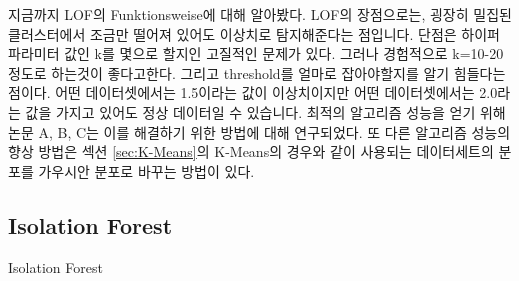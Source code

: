                 지금까지 LOF의 Funktionsweise에 대해 알아봤다. LOF의 장점으로는, 굉장히 밀집된 클러스터에서 조금만 떨어져 있어도 이상치로 탐지해준다는 점입니다. 단점은 하이퍼파라미터 값인 k를 몇으로 할지인 고질적인 문제가 있다. 그러나 경험적으로 k=10-20 \cite{Breunig00} 정도로 하는것이 좋다고한다. 그리고 threshold를 얼마로 잡아야할지를 알기 힘들다는 점이다. 어떤 데이터셋에서는 1.5이라는 값이 이상치이지만 어떤 데이터셋에서는 2.0라는 값을 가지고 있어도 정상 데이터일 수 있습니다. 최적의 알고리즘 성능을 얻기 위해 논문 A, B, C는 이를 해결하기 위한 방법에 대해 연구되었다. 또 다른 알고리즘 성능의 향상 방법은 섹션 \ref{sec:K-Means}의 K-Means의 경우와 같이 사용되는 데이터세트의 분포를 가우시안 분포로 바꾸는 방법이 있다.
                
            \subsection{Isolation Forest}
                Isolation Forest
                
            